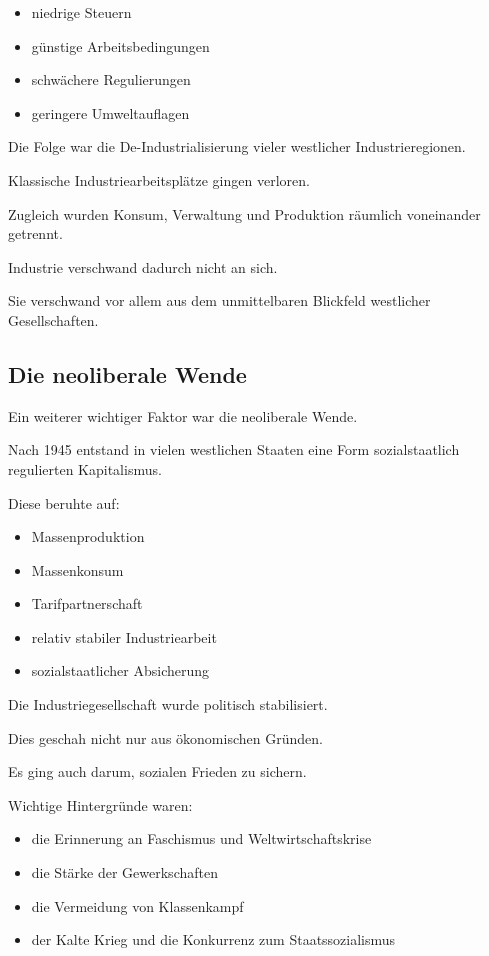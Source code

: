 \begin{itemize}
\item niedrige Steuern
\item günstige Arbeitsbedingungen
\item schwächere Regulierungen
\item geringere Umweltauflagen
\end{itemize}

Die Folge war die De-Industrialisierung
vieler westlicher Industrieregionen.

Klassische Industriearbeitsplätze gingen verloren.

Zugleich wurden Konsum,
Verwaltung
und Produktion räumlich voneinander getrennt.

Industrie verschwand dadurch nicht an sich.

Sie verschwand vor allem
aus dem unmittelbaren Blickfeld
westlicher Gesellschaften.

\subsection{Die neoliberale Wende}

Ein weiterer wichtiger Faktor
war die neoliberale Wende.

Nach 1945 entstand in vielen westlichen Staaten
eine Form sozialstaatlich regulierten Kapitalismus.

Diese beruhte auf:

\begin{itemize}
\item Massenproduktion
\item Massenkonsum
\item Tarifpartnerschaft
\item relativ stabiler Industriearbeit
\item sozialstaatlicher Absicherung
\end{itemize}

Die Industriegesellschaft wurde politisch stabilisiert.

Dies geschah nicht nur aus ökonomischen Gründen.

Es ging auch darum,
sozialen Frieden zu sichern.

Wichtige Hintergründe waren:

\begin{itemize}
\item die Erinnerung an Faschismus und Weltwirtschaftskrise
\item die Stärke der Gewerkschaften
\item die Vermeidung von Klassenkampf
\item der Kalte Krieg und die Konkurrenz zum Staatssozialismus
\end{itemize}

